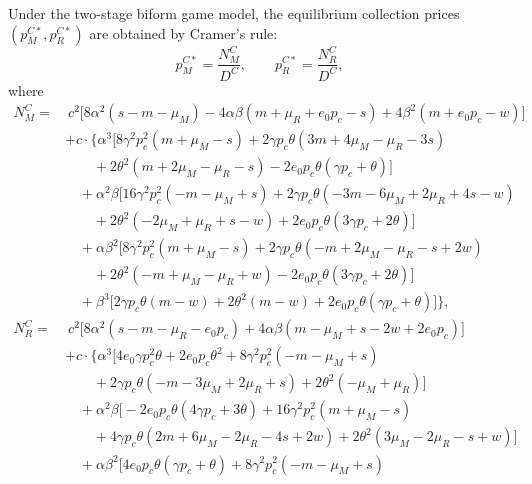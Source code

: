 \documentclass[authoryear,preprint,review,times,10pt]{elsarticle}
\begin{document}
\begin{prop}
\label{prop:biform}
Under the two-stage biform game model, the equilibrium collection prices $(p_M^{C*}, p_R^{C*})$ are obtained by Cramer's rule:
\begin{equation}
p_M^{C*} = \frac{N_M^{C}}{D^{C}}, \qquad p_R^{C*} = \frac{N_R^{C}}{D^{C}},
\end{equation}
where
\begin{equation}
\begin{aligned}
N_M^{C} =&\ c^{2}\big[8\alpha^{2}(s - m - \mu_{M}) - 4\alpha\beta(m + \mu_{R} + e_{0} p_{c} - s) + 4\beta^{2}(m + e_{0} p_{c} - w)\big] \\
&+ c \cdot \big\{ \alpha^{3}\big[8\gamma^{2} p_{c}^{2}(m + \mu_{M} - s) + 2\gamma p_{c}\theta(3m + 4\mu_{M} - \mu_{R} - 3s) \\
&\qquad + 2\theta^{2}(m + 2\mu_{M} - \mu_{R} - s) - 2e_{0} p_{c}\theta(\gamma p_{c} + \theta)\big] \\
&\quad + \alpha^{2}\beta\big[16\gamma^{2} p_{c}^{2}(-m - \mu_{M} + s) + 2\gamma p_{c}\theta(-3m - 6\mu_{M} + 2\mu_{R} + 4s - w) \\
&\qquad + 2\theta^{2}(-2\mu_{M} + \mu_{R} + s - w) + 2e_{0} p_{c}\theta(3\gamma p_{c} + 2\theta)\big] \\
&\quad + \alpha\beta^{2}\big[8\gamma^{2} p_{c}^{2}(m + \mu_{M} - s) + 2\gamma p_{c}\theta(-m + 2\mu_{M} - \mu_{R} - s + 2w) \\
&\qquad + 2\theta^{2}(-m + \mu_{M} - \mu_{R} + w) - 2e_{0} p_{c}\theta(3\gamma p_{c} + 2\theta)\big] \\
&\quad + \beta^{3}\big[2\gamma p_{c}\theta(m - w) + 2\theta^{2}(m - w) + 2e_{0} p_{c}\theta(\gamma p_{c} + \theta)\big] \big\}, \\[3pt]
N_R^{C} =&\ c^{2}\big[8\alpha^{2}(s - m - \mu_{R} - e_{0} p_{c}) + 4\alpha\beta(m - \mu_{M} + s - 2w + 2e_{0} p_{c})\big] \\
&+ c \cdot \big\{ \alpha^{3}\big[4e_{0}\gamma p_{c}^{2}\theta + 2e_{0} p_{c}\theta^{2} + 8\gamma^{2} p_{c}^{2}(-m - \mu_{M} + s) \\
&\qquad + 2\gamma p_{c}\theta(-m - 3\mu_{M} + 2\mu_{R} + s) + 2\theta^{2}(-\mu_{M} + \mu_{R})\big] \\
&\quad + \alpha^{2}\beta\big[-2e_{0} p_{c}\theta(4\gamma p_{c} + 3\theta) + 16\gamma^{2} p_{c}^{2}(m + \mu_{M} - s) \\
&\qquad + 4\gamma p_{c}\theta(2m + 6\mu_{M} - 2\mu_{R} - 4s + 2w) + 2\theta^{2}(3\mu_{M} - 2\mu_{R} - s + w)\big] \\
&\quad + \alpha\beta^{2}\big[4e_{0} p_{c}\theta(\gamma p_{c} + \theta) + 8\gamma^{2} p_{c}^{2}(-m - \mu_{M} + s) \\

\end{aligned}
\end{equation}
\end{prop}
\end{document}
